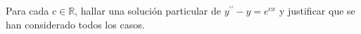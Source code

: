 Para cada \(c\in\mathbb R\), hallar una solución particular de \(y^{\prime\prime}-y=e^{cx}\) y justificar que se han considerado todos los casos.
